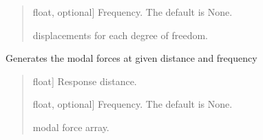 \documentclass[letterpaper,10pt,english]{sphinxmanual}
\begin{document}
\begin{fulllineitems}
\begin{fulllineitems}
\begin{quote}
\begin{description}
\begin{description}
\sphinxlineitem{\sphinxstylestrong{f}}{[}float, optional{]}
\sphinxAtStartPar
Frequency. The default is None.

\end{description}

\begin{description}
\sphinxAtStartPar
displacements for each degree of freedom.

\end{description}

\end{description}\end{quote}

\end{fulllineitems}


\begin{fulllineitems}
\label{\detokenize{model:pywfe.Model.modal_forces}}
\pysigstartsignatures
{}
\pysigstopsignatures
\sphinxAtStartPar
Generates the modal forces at given distance and frequency
\begin{quote}\begin{description}
\begin{description}
\sphinxlineitem{\sphinxstylestrong{x\_r}}{[}float{]}
\sphinxAtStartPar
Response distance.

\sphinxlineitem{\sphinxstylestrong{f}}{[}float, optional{]}
\sphinxAtStartPar
Frequency. The default is None.

\end{description}

\begin{description}
\sphinxAtStartPar
modal force array.

\end{description}

\end{description}\end{quote}

\end{fulllineitems}



\end{fulllineitems}
\end{document}
